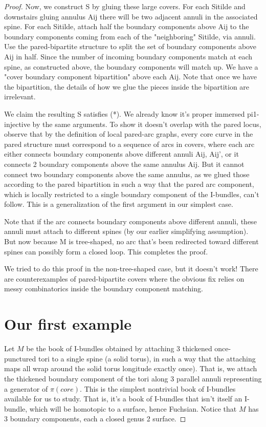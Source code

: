 \documentclass[12pt]{amsart}
\theoremstyle{definition}
\begin{document}
\begin{proof}
Now, we construct S by gluing these large covers. For each Sitilde and
downstairs gluing annulus Aij there will be two adjacent annuli in the
associated spine. For each Sitilde, attach half the boundary components above
Aij to the boundary components coming from each of the "neighboring" Sitilde,
via annuli. Use the pared-bipartite structure to split the set of boundary
components above Aij in half. Since the number of incoming boundary components
match at each spine, as constructed above, the boundary components will match
up. We have a "cover boundary component bipartition" above each Aij. Note that
once we have the bipartition, the details of how we glue the pieces inside the
bipartition are irrelevant.

We claim the resulting S satisfies (*). We already know it's proper immersed
pi1-injective by the same arguments. To show it doesn't overlap with the pared
locus, observe that by the definition of local pared-arc graphs, every core
curve in the pared structure must correspond to a sequence of arcs in covers,
where each arc either connects boundary components above different annuli Aij,
Aij', or it connects 2 boundary components above the same annulus Aij. But it
cannot connect two boundary components above the same annulus, as we glued
those according to the pared bipartition in such a way that the pared arc
component, which is locally restricted to a single boundary component of the
I-bundles, can't follow. This is a generalization of the first argument in our
simplest case.

Note that if the arc connects boundary components above different annuli, these
annuli must attach to different spines (by our earlier simplifying assumption).
But now because M is tree-shaped, no arc that's been redirected toward
different spines can possibly form a closed loop. This completes the proof.

We tried to do this proof in the non-tree-shaped case, but it doesn't work!
There are counterexamples of pared-bipartite covers where the obvious fix
relies on messy combinatorics inside the boundary component matching.

\section{Our first example}

Let $M$ be the book of I-bundles obtained by attaching 3 thickened
once-punctured tori to a single spine (a solid torus), in such a way that the
attaching maps all wrap around the solid torus longitude exactly once). That
is, we attach the thickened boundary component of the tori along 3 parallel
annuli representing a generator of $\pi(core)$. This is the simplest nontrivial
book of I-bundles available for us to study. That is, it's a book of I-bundles
that isn't itself an I-bundle, which will be homotopic to a surface, hence
Fuchsian. Notice that $M$ has 3 boundary components, each a closed genus
2 surface.


\end{proof}
\end{document}
